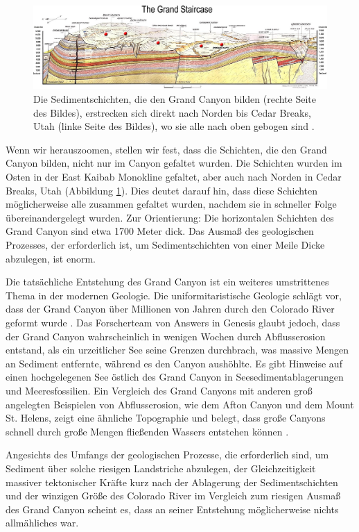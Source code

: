 \documentclass[10pt,twocolumn,letterpaper]{article}
\begin{document}
\begin{figure}
\begin{center}
\includegraphics[width=1\textwidth]{Grand_Staircase-big.jpg}
\end{center}
   \caption{Die Sedimentschichten, die den Grand Canyon bilden (rechte Seite des Bildes), erstrecken sich direkt nach Norden bis Cedar Breaks, Utah (linke Seite des Bildes), wo sie alle nach oben gebogen sind \cite{50}.}
\label{fig:4}
\end{figure}

Wenn wir herauszoomen, stellen wir fest, dass die Schichten, die den Grand Canyon bilden, nicht nur im Canyon gefaltet wurden. Die Schichten wurden im Osten in der East Kaibab Monokline \cite{46} gefaltet, aber auch nach Norden in Cedar Breaks, Utah (Abbildung \ref{fig:4}). Dies deutet darauf hin, dass diese Schichten möglicherweise alle zusammen gefaltet wurden, nachdem sie in schneller Folge übereinandergelegt wurden. Zur Orientierung: Die horizontalen Schichten des Grand Canyon sind etwa 1700 Meter dick. Das Ausmaß des geologischen Prozesses, der erforderlich ist, um Sedimentschichten von einer Meile Dicke abzulegen, ist enorm.

Die tatsächliche Entstehung des Grand Canyon ist ein weiteres umstrittenes Thema in der modernen Geologie. Die uniformitaristische Geologie schlägt vor, dass der Grand Canyon über Millionen von Jahren durch den Colorado River geformt wurde \cite{47}. Das Forscherteam von Answers in Genesis glaubt jedoch, dass der Grand Canyon wahrscheinlich in wenigen Wochen durch Abflusserosion entstand, als ein urzeitlicher See seine Grenzen durchbrach, was massive Mengen an Sediment entfernte, während es den Canyon aushöhlte. Es gibt Hinweise auf einen hochgelegenen See östlich des Grand Canyon in Seesedimentablagerungen und Meeresfossilien. Ein Vergleich des Grand Canyons mit anderen groß angelegten Beispielen von Abflusserosion, wie dem Afton Canyon und dem Mount St. Helens, zeigt eine ähnliche Topographie und belegt, dass große Canyons schnell durch große Mengen fließenden Wassers entstehen können \cite{48}.

Angesichts des Umfangs der geologischen Prozesse, die erforderlich sind, um Sediment über solche riesigen Landstriche abzulegen, der Gleichzeitigkeit massiver tektonischer Kräfte kurz nach der Ablagerung der Sedimentschichten und der winzigen Größe des Colorado River im Vergleich zum riesigen Ausmaß des Grand Canyon scheint es, dass an seiner Entstehung möglicherweise nichts allmähliches war.
\end{document}

